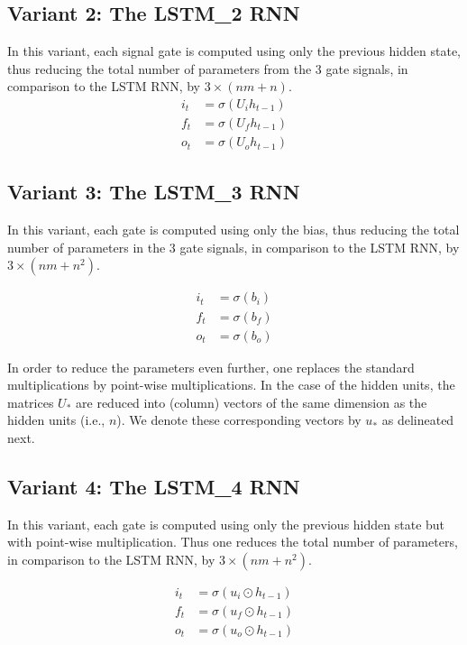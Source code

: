 \documentclass{article}
\begin{document}
\subsection{Variant 2: The LSTM\_2 RNN}
In this variant, each signal gate is computed using only the previous hidden state, thus reducing the total number of parameters from the 3 gate signals, in comparison to the LSTM RNN, by $3 \times (nm + n)$.
\begin{align}
	i_t &= \sigma(U_i h_{t-1})\\
	f_t &= \sigma(U_f h_{t-1})\\
	o_t &= \sigma(U_o h_{t-1})
\end{align}

\subsection{Variant 3: The LSTM\_3 RNN}
In this variant, each gate is computed using only the bias, thus reducing the total number of parameters in the 3 gate signals, in comparison to the LSTM RNN, by $3 \times (nm + n^2)$.

\begin{align}
	i_t &= \sigma(b_i)\\
	f_t &= \sigma(b_f)\\
	o_t &= \sigma(b_o)
\end{align}

In order to reduce the parameters even further, one replaces the standard multiplications by point-wise multiplications. In the case of the hidden units, the matrices $U_{*}$ are reduced into (column) vectors of the same dimension as the hidden units (i.e., $n$). We denote these corresponding vectors by $u_{*}$ as delineated next.

\subsection{Variant 4: The LSTM\_4 RNN}
In this variant, each gate is computed using only the previous hidden state but with point-wise multiplication. Thus one reduces  the total number of parameters, in comparison to the LSTM RNN, by $3 \times (nm + n^2)$.


\begin{align}
	i_t &= \sigma(u_i \odot  h_{t-1})\\
	f_t &= \sigma(u_f \odot h_{t-1})\\
	o_t &= \sigma(u_o \odot  h_{t-1})
\end{align}
\end{document}
